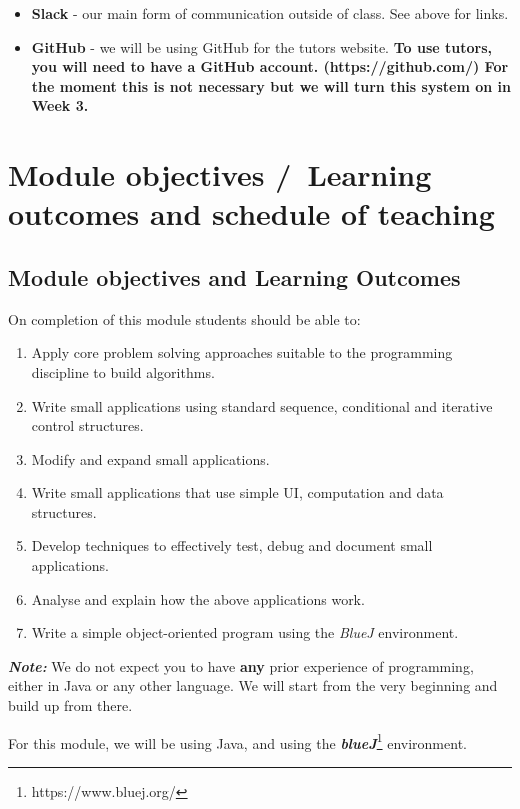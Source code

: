 \documentclass{article}
\begin{document}
\begin{itemize}
\begin{itemize}
\end{itemize}


\item \textbf{Slack} - our main form of communication outside of 
class. See above for links.

\item \textbf{GitHub} - we will be using GitHub for the tutors website.   
\textbf{To use tutors, you will need to have a GitHub account. (https://github.com/) For the moment this is not necessary but we will turn this system on in Week 3.} 

\end{itemize}

\pagebreak
\section{Module objectives /\ Learning outcomes and schedule of teaching}

\subsection{Module objectives and Learning Outcomes}

On completion of this module students should be able to: 
\begin{enumerate}
   \item Apply core problem solving approaches suitable to the programming discipline to build algorithms.
   \item Write small applications using standard sequence, conditional and iterative control structures.
   \item Modify and expand small applications.
   \item Write small applications that use simple UI, computation and data structures.
   \item Develop techniques to effectively test, debug and document small applications.
   \item Analyse and explain how the above applications work.
   \item Write a simple object-oriented program using the \textit{BlueJ} environment.
\end{enumerate}

\textbf{ \textit{Note:}} We do not expect you to have \textbf{any} prior experience of programming, either in Java or any other language. 
We will start from the very beginning and build up from there.

For this module, we will be using Java, and using the \textbf{\textit{blueJ}}\footnote{https://www.bluej.org/} environment. 
\end{document}
